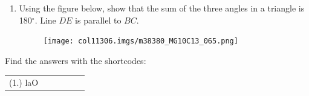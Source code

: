         
        \label{m38380*id320611}\begin{enumerate}[noitemsep,
label=\textbf{\arabic*}. ] 
            \label{m38380*uid133}\item Using the figure below, show that the sum
of the three angles in a triangle is 180\begin{math}{}^{\circ }\end{math}. Line
\begin{math}DE\end{math}\hspace{1ex} is parallel to \begin{math}BC\end{math}.

    \setcounter{subfigure}{0}


	\begin{figure}[H] %
    \begin{center}
   
\label{m38380*id320668!!!underscore!!!media}\label{
m38380*id320668!!!underscore!!!printimage}\texttt{[image: 
col11306.imgs/m38380\_MG10C13\_065.png]} %
        
      \vspace{2pt}
    \vspace{.1in}
    
    \end{center}

 \end{figure}   

    \addtocounter{footnote}{-0}
    \newline
            \end{enumerate}
        
      
    
  \label{m38380**end}
    
\par {} Find the
answers with the shortcodes:
 \par \begin{tabular}[h]{cccccc}
 (1.) laO  & \end{tabular}